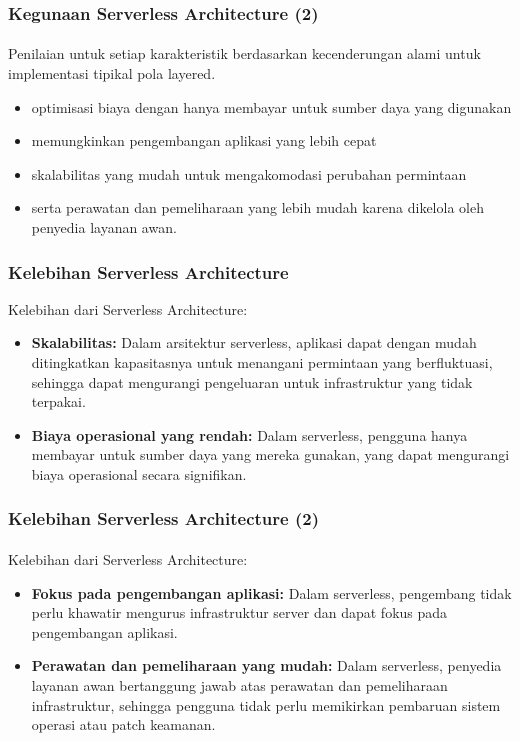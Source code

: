\documentclass[aspectratio=169, table]{beamer}
\begin{document}
	\begin{frame}\frametitle{Kegunaan Serverless Architecture (2)}
		\framesubtitle{\hspace{1cm}}

		Penilaian untuk setiap karakteristik berdasarkan kecenderungan alami untuk implementasi tipikal pola layered.

		\begin{itemize}
			\item optimisasi biaya dengan hanya membayar untuk sumber daya yang digunakan
			\item memungkinkan pengembangan aplikasi yang lebih cepat
			\item skalabilitas yang mudah untuk mengakomodasi perubahan permintaan
			\item serta perawatan dan pemeliharaan yang lebih mudah karena dikelola oleh penyedia layanan awan.
		\end{itemize}
	\end{frame}

	\begin{frame}\frametitle{Kelebihan Serverless Architecture}
		Kelebihan dari Serverless Architecture:
		\begin{itemize}
			\item \textbf{Skalabilitas:} Dalam arsitektur serverless, aplikasi dapat dengan mudah ditingkatkan kapasitasnya untuk menangani permintaan yang berfluktuasi, sehingga dapat mengurangi pengeluaran untuk infrastruktur yang tidak terpakai.
			\item \textbf{Biaya operasional yang rendah:} Dalam serverless, pengguna hanya membayar untuk sumber daya yang mereka gunakan, yang dapat mengurangi biaya operasional secara signifikan.

		\end{itemize}
	\end{frame}

	\begin{frame}\frametitle{Kelebihan Serverless Architecture (2)}
		\framesubtitle{\hspace{1cm}}
		Kelebihan dari Serverless Architecture:
		\begin{itemize}

			\item \textbf{Fokus pada pengembangan aplikasi:} Dalam serverless, pengembang tidak perlu khawatir mengurus infrastruktur server dan dapat fokus pada pengembangan aplikasi.
			\item \textbf{Perawatan dan pemeliharaan yang mudah:} Dalam serverless, penyedia layanan awan bertanggung jawab atas perawatan dan pemeliharaan infrastruktur, sehingga pengguna tidak perlu memikirkan pembaruan sistem operasi atau patch keamanan.
		\end{itemize}
	\end{frame}
\end{document}
